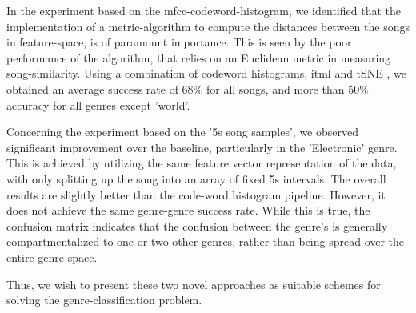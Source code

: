 \documentclass[10pt]{article}
\begin{document}
In the experiment based on the mfcc-codeword-histogram, we identified that the implementation of a metric-algorithm to compute the distances between the songs in feature-space, is of paramount importance. This is seen by the poor performance of the algorithm, that relies on an Euclidean metric in measuring song-similarity. Using a combination of codeword histograms, itml and tSNE , we obtained an average success rate of $68\%$ for all songs, and more than $50\%$ accuracy for all genres except 'world'.

Concerning the experiment based on the '5s song samples', we observed significant improvement over the baseline, particularly in the 'Electronic' genre. This is achieved by utilizing the same feature vector representation of the data, with only splitting up the song into an array of fixed 5s intervals. The overall results are slightly better than the code-word histogram pipeline. However, it does not achieve the same genre-genre success rate. While this is true, the confusion matrix indicates that the confusion between the genre's is generally compartmentalized to one or two other genres, rather than being spread over the entire genre space. 

Thus, we wish to present these two novel approaches  as suitable schemes for solving the genre-classification problem.
\end{document}
